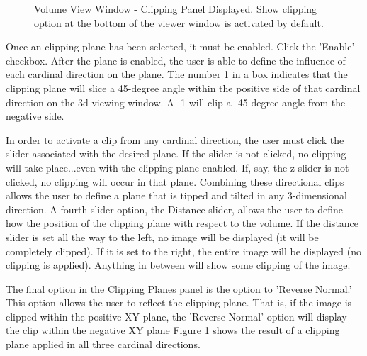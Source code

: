 \documentclass[fleqn,11pt,openany]{book}
\begin{document}
\begin{figure}[b!]
\caption{Volume View Window - Clipping Panel Displayed. Show clipping option at the bottom of the viewer window is activated by default.}\label{fig:ClippingPanel}
\end{figure}

Once an clipping plane has been selected, it must be enabled.  Click the 'Enable' checkbox.  
After the plane is enabled, the user is able to define the influence of each cardinal direction on the plane.  
The number 1 in a box indicates that the clipping plane will slice a 45-degree angle within the positive side of that cardinal direction on the 3d viewing window. 
A -1 will clip a -45-degree angle from the negative side.

In order to activate a clip from any cardinal direction, the user must click the slider associated with the desired plane.
If the slider is not clicked, no clipping will take place...even with the clipping plane enabled.
If, say, the z slider is not clicked, no clipping will occur in that plane.
Combining these directional clips allows the user to define a plane that is tipped and tilted in any 3-dimensional direction.
A fourth slider option, the Distance slider, allows the user to define how the position of the clipping plane with respect to the volume.  
If the distance slider is set all the way to the left, no image will be displayed (it will be completely clipped).
If it is set to the right, the entire image will be displayed (no clipping is applied).  
Anything in between will show some clipping of the image.

The final option in the Clipping Planes panel is the option to 'Reverse Normal.'
This option allows the user to reflect the clipping plane.
That is, if the image is clipped within the positive XY plane, the 'Reverse Normal' option will display the clip within the negative XY plane
Figure \ref{fig:ClippingPanel} shows the result of a clipping plane applied in all three cardinal directions.
\end{document}
